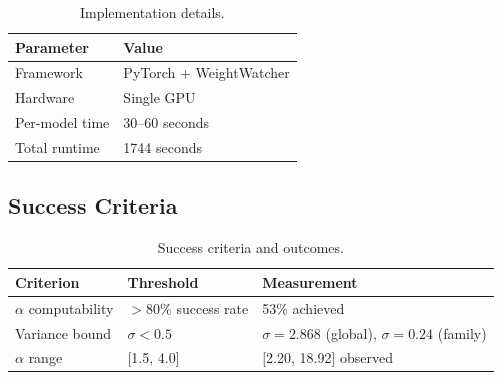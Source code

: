 \begin{table}[h]
\centering
\begin{tabular}{ll}
\toprule
\textbf{Parameter} & \textbf{Value} \\
\midrule
Framework & PyTorch + WeightWatcher \\
Hardware & Single GPU \\
Per-model time & 30--60 seconds \\
Total runtime & 1744 seconds \\
\bottomrule
\end{tabular}
\caption{Implementation details.}
\label{tab:implementation}
\end{table}

\subsection{Success Criteria}

\begin{table}[h]
\centering
\begin{tabular}{lll}
\toprule
\textbf{Criterion} & \textbf{Threshold} & \textbf{Measurement} \\
\midrule
$\alpha$ computability & $>$80\% success rate & 53\% achieved \\
Variance bound & $\sigma < 0.5$ & $\sigma = 2.868$ (global), $\sigma = 0.24$ (family) \\
$\alpha$ range & [1.5, 4.0] & [2.20, 18.92] observed \\
\bottomrule
\end{tabular}
\caption{Success criteria and outcomes.}
\label{tab:criteria}
\end{table}
